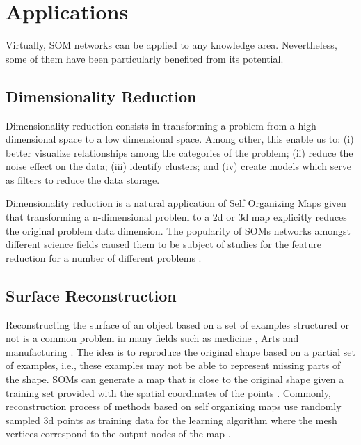 \section{Applications}

Virtually, SOM networks can be applied to any knowledge area. Nevertheless, some of them have been particularly benefited from its potential.

\subsection{Dimensionality Reduction}

Dimensionality reduction consists in transforming a problem from a high dimensional space to a low dimensional space. Among other, this enable us to: (i) better visualize relationships among the categories of the problem; (ii) reduce the noise effect on the data; (iii) identify clusters; and (iv) create models which serve as filters to reduce the data storage. 

Dimensionality reduction is a natural application of Self Organizing Maps given that transforming a n-dimensional problem to a 2d or 3d map explicitly reduces the original problem data dimension. The popularity of SOMs networks amongst different science fields caused them to be subject of studies for the feature reduction for a number of different problems \cite{pmid:24575660}\cite{Pratiwi2012TheUO}\cite{kutlu}\cite{liu}.



\subsection{Surface Reconstruction}

Reconstructing the surface of an object based on a set of examples structured or not is a common problem in many fields such as medicine \cite{Satava}, Arts \cite{974519} and manufacturing \cite{Bernardini}. The idea is to reproduce the original shape based on a partial set of examples, i.e., these examples may not be able to represent missing parts of the shape. SOMs can generate a map that is close to the original shape given a training set provided with the spatial coordinates of the points \cite{4371248}. Commonly, reconstruction process of methods based on self organizing maps use randomly sampled 3d points as training data for the learning algorithm where the mesh vertices correspond to the output nodes of the map \cite{4371248}.

